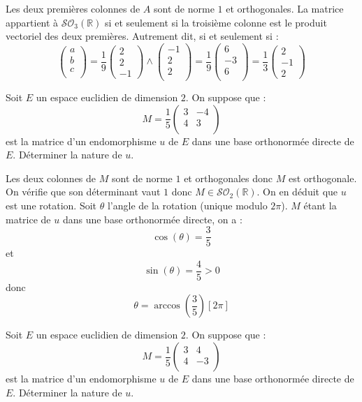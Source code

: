 \documentclass[a4paper,10pt]{report}
\begin{document}
\corr Les deux premières colonnes de $A$ sont de norme $1$ et orthogonales. La matrice appartient à $\mathcal{SO}_3(\mathbb{R})$ si et seulement si la troisième colonne est le produit vectoriel des deux premières. Autrement dit, si et seulement si :
$$ \begin{pmatrix}
a \\
b \\
c \\
\end{pmatrix} = \dfrac{1}{9} \begin{pmatrix}
2 \\
2 \\
-1
\end{pmatrix} \wedge \begin{pmatrix}
-1 \\
2 \\
2 \\
\end{pmatrix} = \dfrac{1}{9} \begin{pmatrix}
6 \\
-3  \\
6 \\
\end{pmatrix} = \dfrac{1}{3} \begin{pmatrix}
2 \\
-1 \\
2
\end{pmatrix}$$

\begin{Exa} Soit $E$ un espace euclidien de dimension $2$. On suppose que :
$$ M = \dfrac{1}{5} \begin{pmatrix}
3 & -4 \\
4 & 3 \\
\end{pmatrix}$$
est la matrice d'un endomorphisme $u$ de $E$ dans une base orthonormée directe de $E$. Déterminer la nature de $u$.
\end{Exa}

\corr Les deux colonnes de $M$ sont de norme $1$ et orthogonales donc $M$ est orthogonale. On vérifie que son déterminant vaut $1$ donc $M \in \mathcal{SO}_2(\mathbb{R})$. On en déduit que $u$ est une rotation. Soit $\theta$ l'angle de la rotation (unique modulo $2 \pi$). $M$ étant la matrice de $u$ dans une base orthonormée directe, on a :
$$ \cos(\theta)= \dfrac{3}{5}$$
et 
$$ \sin(\theta) = \dfrac{4}{5}>0$$
donc
$$ \theta = \arccos\left( \dfrac{3}{5} \right) [2 \pi]$$

\begin{Exa} Soit $E$ un espace euclidien de dimension $2$. On suppose que :
$$ M = \dfrac{1}{5} \begin{pmatrix}
3 & 4 \\
4 & -3 \\
\end{pmatrix}$$
est la matrice d'un endomorphisme $u$ de $E$ dans une base orthonormée directe de $E$. Déterminer la nature de $u$.
\end{Exa}
\end{document}
